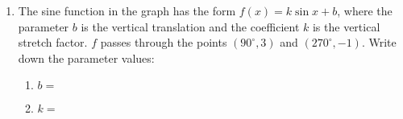 \documentclass[12pt, twoside]{article}
\begin{document}
\begin{enumerate}
\item The sine function in the graph has the form $f(x)=k \sin x + b$, where the parameter $b$ is the vertical translation and the coefficient $k$ is the vertical stretch factor. $f$ passes through the points $(90^\circ, 3)$ and $(270^\circ, -1)$. Write down the parameter values:
\begin{multicols}{2}
  \begin{enumerate}
    \item $b=$ \vspace{1cm}
    \item $k=$
  \end{enumerate}\vspace{1cm}
  \begin{center}
  \end{center}
\end{multicols}

\end{enumerate}
\end{document}
